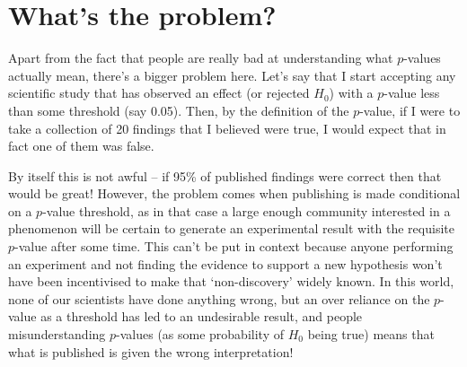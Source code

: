 \documentclass{tufte-handout}
\theoremstyle{plain}
\theoremstyle{definition}
\begin{document}
\section{What's the problem?}

Apart from the fact that people are really bad at understanding what $p$-values actually mean, there's a bigger problem here.
Let's say that I start accepting any scientific study that has observed an effect (or rejected $H_0$) with a $p$-value less than some threshold (say 0.05).
Then, by the definition of the $p$-value, if I were to take a collection of 20 findings that I believed were true, I would expect that in fact one of them was false.

By itself this is not awful -- if 95\% of published findings were correct then that would be great!
However, the problem comes when publishing is made conditional on a $p$-value threshold, as in that case a large enough community interested in a phenomenon will be certain to generate an experimental result with the requisite $p$-value after some time.
This can't be put in context because anyone performing an experiment and not finding the evidence to support a new hypothesis won't have been incentivised to make that `non-discovery' widely known.
In this world, none of our scientists have done anything wrong, but an over reliance on the $p$-value as a threshold has led to an undesirable result, and people misunderstanding $p$-values (as some probability of $H_0$ being true) means that what is published is given the wrong interpretation!



\end{document}

